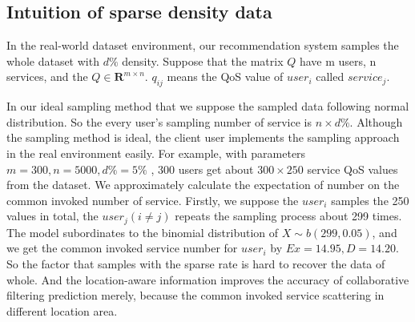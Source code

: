 \documentclass[conference]{IEEEtran}
\begin{document}
\subsection{Intuition of sparse density data}
\par In the real-world dataset environment, our recommendation system samples the whole dataset with $d \%$ density. Suppose that the matrix $Q$ have m users, n services, and the $Q\in \textbf{R}^{m\times n}$. $q_{ij}$ means the QoS value of $user_{i}$ called $service_{j}$. 
\par In our ideal sampling method that we suppose the sampled data following normal distribution. So the every user's sampling number of service is $n\times d \% $. Although the sampling method is ideal, the client user implements the sampling approach in the real environment easily. For example, with parameters $ m=300 , n=5000 , d\%=5\% $ , 300 users get about $ 300 \times 250 $ service QoS values from the dataset. We approximately calculate the expectation of number on the common invoked number of service. Firstly, we suppose the $user_i$ samples the 250 values in total, the $user_j (i \neq j)$ repeats the sampling process about 299 times. The model subordinates to the binomial distribution of $X \sim b(299,0.05)$, and we get the common invoked service number for $user_i$ by $Ex=14.95,D=14.20$. So the factor that samples with the sparse rate is hard to recover the data of whole. And the location-aware information improves the accuracy of collaborative filtering prediction merely, because the common invoked service scattering in different location area.

\end{document}
